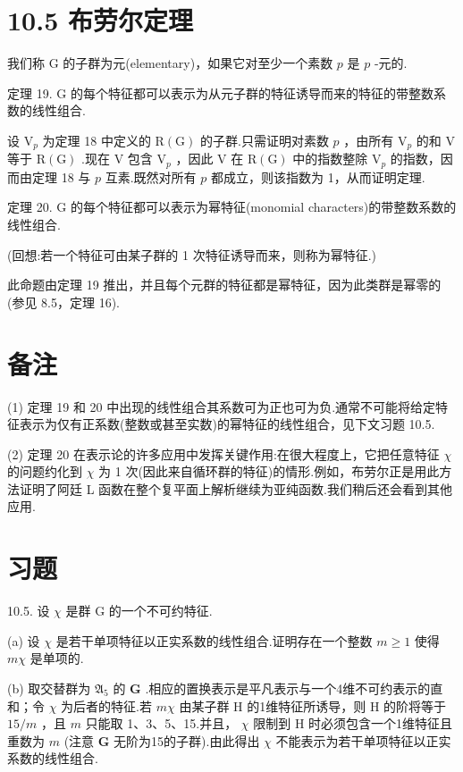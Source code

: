 \documentclass[10pt]{article}
\begin{document}
\section*{10.5 布劳尔定理}

我们称 \(\mathrm{G}\) 的子群为元(elementary)，如果它对至少一个素数 \(p\) 是 \(p\) -元的.

定理 19. \(\mathrm{G}\) 的每个特征都可以表示为从元子群的特征诱导而来的特征的带整数系数的线性组合.

设 \({\mathrm{V}}_{p}\) 为定理 18 中定义的 \(\mathrm{R}\left( \mathrm{G}\right)\) 的子群.只需证明对素数 \(p\) ，由所有 \({\mathrm{V}}_{p}\) 的和 \(\mathrm{V}\) 等于 \(\mathrm{R}\left( \mathrm{G}\right)\) .现在 \(\mathrm{V}\) 包含 \({\mathrm{V}}_{p}\) ，因此 \(\mathrm{V}\) 在 \(\mathrm{R}\left( \mathrm{G}\right)\) 中的指数整除 \({\mathrm{V}}_{p}\) 的指数，因而由定理 18 与 \(p\) 互素.既然对所有 \(p\) 都成立，则该指数为 1，从而证明定理.

定理 20. \(\mathrm{G}\) 的每个特征都可以表示为幂特征(monomial characters)的带整数系数的线性组合.

(回想:若一个特征可由某子群的 1 次特征诱导而来，则称为幂特征.)

此命题由定理 19 推出，并且每个元群的特征都是幂特征，因为此类群是幂零的(参见 8.5，定理 16).

\section*{备注}

(1) 定理 19 和 20 中出现的线性组合其系数可为正也可为负.通常不可能将给定特征表示为仅有正系数(整数或甚至实数)的幂特征的线性组合，见下文习题 10.5.

(2) 定理 20 在表示论的许多应用中发挥关键作用:在很大程度上，它把任意特征 \(\chi\) 的问题约化到 \(\chi\) 为 1 次(因此来自循环群的特征)的情形.例如，布劳尔正是用此方法证明了阿廷 L 函数在整个复平面上解析继续为亚纯函数.我们稍后还会看到其他应用.

\section*{习题}

10.5. 设 \(\chi\) 是群 G 的一个不可约特征.

(a) 设 \(\chi\) 是若干单项特征以正实系数的线性组合.证明存在一个整数 \(m \geq  1\) 使得 \({m\chi }\) 是单项的.

(b) 取交替群为 \({\mathfrak{A}}_{5}\) 的 \(\mathbf{G}\) .相应的置换表示是平凡表示与一个4维不可约表示的直和；令 \(\chi\) 为后者的特征.若 \({m\chi }\) 由某子群 \(\mathrm{H}\) 的1维特征所诱导，则 \(\mathrm{H}\) 的阶将等于 \({15}/m\) ，且 \(m\) 只能取 1、3、5、15.并且， \(\chi\) 限制到 \(\mathrm{H}\) 时必须包含一个1维特征且重数为 \(m\) (注意 \(\mathbf{G}\) 无阶为15的子群).由此得出 \(\chi\) 不能表示为若干单项特征以正实系数的线性组合.
\end{document}
